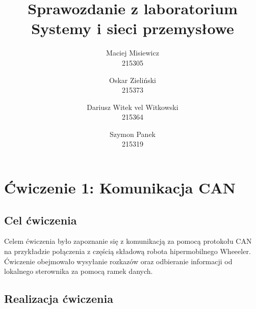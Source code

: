 \documentclass[margin = 2cm]{article}
\begin{document}
\title{\textbf{Sprawozdanie z laboratorium \\Systemy i sieci przemysłowe}} %
\author{Maciej Misiewicz\\215305 \and Oskar Zieliński\\215373 \and Dariusz Witek vel Witkowski\\215364 \and Szymon Panek\\215319}

\maketitle


\newpage
\tableofcontents
\newpage


\section{Ćwiczenie 1: Komunikacja CAN}
	\subsection{Cel ćwiczenia}
	Celem ćwiczenia było zapoznanie się z komunikacją za pomocą protokołu CAN na przykładzie połączenia z częścią składową robota hipermobilnego Wheeeler. Ćwiczenie obejmowało wysyłanie rozkazów oraz odbieranie informacji od lokalnego sterownika za pomocą ramek danych.
	\subsection{Realizacja ćwiczenia}
\end{document}
